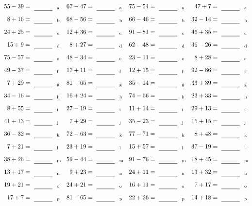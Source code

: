 \documentclass
[
  draft    = true,
  fontsize = 11pt,
  parskip  = half-
]
{scrartcl}
\begin{document}
\clearpage
\begin{align*}
    \pline{55-39}&=\rline{a}
  & \pline{67-47}&=\rline{a}
  & \pline{75-54}&=\rline{a}
  & \pline{47+7}&=\rline{a} \\[1ex]
    \pline{8+16}&=\rline{b}
  & \pline{68-56}&=\rline{b}
  & \pline{66-46}&=\rline{b}
  & \pline{32-14}&=\rline{b} \\[1ex]
    \pline{24+25}&=\rline{c}
  & \pline{12+36}&=\rline{c}
  & \pline{91-81}&=\rline{c}
  & \pline{46+35}&=\rline{c} \\[1ex]
    \pline{15+9}&=\rline{d}
  & \pline{8+27}&=\rline{d}
  & \pline{62-48}&=\rline{d}
  & \pline{36-26}&=\rline{d} \\[1ex]
    \pline{75-57}&=\rline{e}
  & \pline{48-34}&=\rline{e}
  & \pline{23-11}&=\rline{e}
  & \pline{8+28}&=\rline{e} \\[1ex]
    \pline{49-37}&=\rline{f}
  & \pline{17+11}&=\rline{f}
  & \pline{12+15}&=\rline{f}
  & \pline{92-86}&=\rline{f} \\[1ex]
    \pline{7+29}&=\rline{g}
  & \pline{81-65}&=\rline{g}
  & \pline{35-14}&=\rline{g}
  & \pline{33+39}&=\rline{g} \\[1ex]
    \pline{34-16}&=\rline{h}
  & \pline{16+24}&=\rline{h}
  & \pline{74-66}&=\rline{h}
  & \pline{23+33}&=\rline{h} \\[1ex]
    \pline{8+55}&=\rline{i}
  & \pline{27-19}&=\rline{i}
  & \pline{11+14}&=\rline{i}
  & \pline{29+13}&=\rline{i} \\[1ex]
    \pline{41+13}&=\rline{j}
  & \pline{7+29}&=\rline{j}
  & \pline{35-23}&=\rline{j}
  & \pline{15+15}&=\rline{j} \\[1ex]
    \pline{36-32}&=\rline{k}
  & \pline{72-63}&=\rline{k}
  & \pline{77-71}&=\rline{k}
  & \pline{8+48}&=\rline{k} \\[1ex]
    \pline{7+21}&=\rline{l}
  & \pline{23+19}&=\rline{l}
  & \pline{15+57}&=\rline{l}
  & \pline{37-19}&=\rline{l} \\[1ex]
    \pline{38+26}&=\rline{m}
  & \pline{59-44}&=\rline{m}
  & \pline{91-76}&=\rline{m}
  & \pline{18+45}&=\rline{m} \\[1ex]
    \pline{13+17}&=\rline{n}
  & \pline{9+23}&=\rline{n}
  & \pline{24+11}&=\rline{n}
  & \pline{13+32}&=\rline{n} \\[1ex]
    \pline{19+21}&=\rline{o}
  & \pline{24+21}&=\rline{o}
  & \pline{16+11}&=\rline{o}
  & \pline{7+17}&=\rline{o} \\[1ex]
    \pline{17+7}&=\rline{p}
  & \pline{81-65}&=\rline{p}
  & \pline{22+26}&=\rline{p}
  & \pline{14+18}&=\rline{p}
\end{align*}
\end{document}
